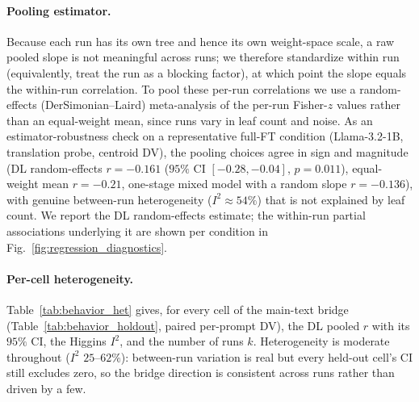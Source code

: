 \documentclass{article}
\theoremstyle{definition}
\theoremstyle{plain}
\begin{document}
\paragraph{Pooling estimator.} Because each run has its own tree and hence its own weight-space scale, a
raw pooled slope is not meaningful across runs; we therefore standardize within run (equivalently, treat
the run as a blocking factor), at which point the slope equals the within-run correlation. To pool these
per-run correlations we use a random-effects (DerSimonian--Laird) meta-analysis of the per-run Fisher-$z$
values rather than an equal-weight mean, since runs vary in leaf count and noise. As an estimator-robustness check on a representative full-FT
condition (Llama-3.2-1B, translation probe, centroid DV), the pooling choices agree in sign and
magnitude (DL random-effects $r=-0.161$ ($95\%$ CI $[-0.28,-0.04]$, $p=0.011$), equal-weight mean
$r=-0.21$, one-stage mixed model with a random slope $r=-0.136$), with genuine between-run heterogeneity
($I^2\approx54\%$) that is not explained by leaf count. We report the DL random-effects estimate; the within-run partial
associations underlying it are shown per condition in Fig.~\ref{fig:regression_diagnostics}.

\paragraph{Per-cell heterogeneity.} Table~\ref{tab:behavior_het} gives, for every cell of the main-text
bridge (Table~\ref{tab:behavior_holdout}, paired per-prompt DV), the DL pooled $r$ with its $95\%$ CI,
the Higgins $I^2$, and the number of runs $k$. Heterogeneity is moderate throughout ($I^2$ $25$--$62\%$):
between-run variation is real but every held-out cell's CI still excludes zero, so the bridge direction
is consistent across runs rather than driven by a few.
\end{document}

